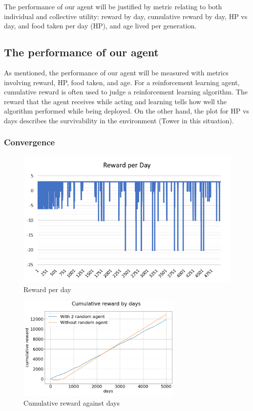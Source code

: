 The performance of our agent will be justified by metric relating to both individual and collective utility: reward by day, cumulative reward by day, HP vs day, and food taken per day (HP), and age lived per generation.

\subsection{The performance of our agent}
As mentioned, the performance of our agent will be measured with metrics involving reward, HP, food taken, and age. For a reinforcement learning agent, cumulative reward is often used to judge a reinforcement learning algorithm. The reward that the agent receives while acting and learning tells how well the algorithm performed while being deployed. On the other hand, the plot for HP vs days describes the survivability in the environment (Tower in this situation).
\subsubsection{Convergence}
\begin{figure}
\centering
\includegraphics{004_team_2_agent_design/rewardperday}
\caption{Reward per day}
\label{rewday-team2}
\end{figure}

\begin{figure}
\centering
\includegraphics{004_team_2_agent_design/cumrewardbydays}
\caption{Cumulative reward against days}
\label{cumday-team2}
\end{figure}

